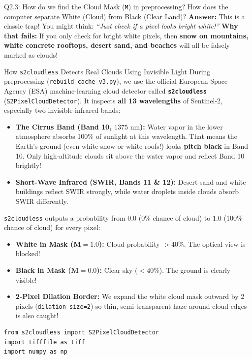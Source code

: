 \documentclass[11pt,a4paper]{article}
\begin{document}
\begin{qbox}{Q2.3: How do we find the Cloud Mask (\texttt{M}) in preprocessing? How does the computer separate White (Cloud) from Black (Clear Land)?}
\textbf{Answer:}
This is a classic trap! You might think: \textit{``Just check if a pixel looks bright white!''}
\textbf{Why that fails:} If you only check for bright white pixels, then \textbf{snow on mountains, white concrete rooftops, desert sand, and beaches} will all be falsely marked as clouds!

\begin{blackbox}{How \texttt{s2cloudless} Detects Real Clouds Using Invisible Light}
During preprocessing (\texttt{rebuild\_cache\_v3.py}), we use the official European Space Agency (ESA) machine-learning cloud detector called \textbf{\texttt{s2cloudless}} (\texttt{S2PixelCloudDetector}). It inspects \textbf{all 13 wavelengths} of Sentinel-2, especially two invisible infrared bands:
\begin{itemize}[leftmargin=18pt]
    \item \textbf{The Cirrus Band (Band 10, $1375\text{ nm}$):} Water vapor in the lower atmosphere absorbs 100\% of sunlight at this wavelength. That means the Earth's ground (even white snow or white roofs!) looks \textbf{pitch black} in Band 10. Only high-altitude clouds sit above the water vapor and reflect Band 10 brightly!
    \item \textbf{Short-Wave Infrared (SWIR, Bands 11 \& 12):} Desert sand and white buildings reflect SWIR strongly, while water droplets inside clouds absorb SWIR differently.
\end{itemize}
\texttt{s2cloudless} outputs a probability from $0.0$ ($0\%$ chance of cloud) to $1.0$ ($100\%$ chance of cloud) for every pixel:
\begin{itemize}[leftmargin=18pt]
    \item \textbf{White in Mask ($\mathbf{M} = 1.0$):} Cloud probability $> 40\%$. The optical view is blocked!
    \item \textbf{Black in Mask ($\mathbf{M} = 0.0$):} Clear sky ($< 40\%$). The ground is clearly visible!
    \item \textbf{2-Pixel Dilation Border:} We expand the white cloud mask outward by 2 pixels (\texttt{dilation\_size=2}) so thin, semi-transparent haze around cloud edges is also caught!
\end{itemize}
\end{blackbox}

\begin{lstlisting}[caption={Exact Preprocessing Code That Generates the Cloud Mask (from \texttt{rebuild\_cache\_v3.py})}]
from s2cloudless import S2PixelCloudDetector
import tifffile as tiff
import numpy as np


\end{lstlisting}
\end{qbox}
\end{document}
